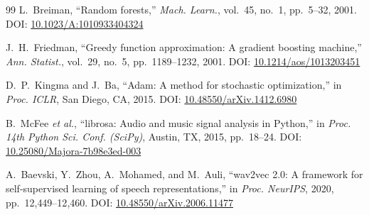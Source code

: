 \documentclass[conference]{IEEEtran}
\begin{document}
\begin{thebibliography}{99}
L.~Breiman,
``Random forests,''
\emph{Mach. Learn.}, vol.~45, no.~1, pp.~5--32, 2001.
\newblock DOI: \href{https://doi.org/10.1023/A:1010933404324}{10.1023/A:1010933404324}

J.~H.~Friedman,
``Greedy function approximation: A gradient boosting machine,''
\emph{Ann. Statist.}, vol.~29, no.~5, pp.~1189--1232, 2001.
\newblock DOI: \href{https://doi.org/10.1214/aos/1013203451}{10.1214/aos/1013203451}

D.~P.~Kingma and J.~Ba,
``Adam: A method for stochastic optimization,''
in \emph{Proc. ICLR}, San Diego, CA, 2015.
\newblock DOI: \href{https://doi.org/10.48550/arXiv.1412.6980}{10.48550/arXiv.1412.6980}

B.~McFee \emph{et al.},
``librosa: Audio and music signal analysis in Python,''
in \emph{Proc. 14th Python Sci. Conf. (SciPy)}, Austin, TX, 2015,
pp.~18--24.
\newblock DOI: \href{https://doi.org/10.25080/Majora-7b98e3ed-003}{10.25080/Majora-7b98e3ed-003}

A.~Baevski, Y.~Zhou, A.~Mohamed, and M.~Auli,
``wav2vec 2.0: A framework for self-supervised learning of speech
representations,''
in \emph{Proc. NeurIPS}, 2020, pp.~12{,}449--12{,}460.
\newblock DOI: \href{https://doi.org/10.48550/arXiv.2006.11477}{10.48550/arXiv.2006.11477}

\end{thebibliography}
\end{document}
